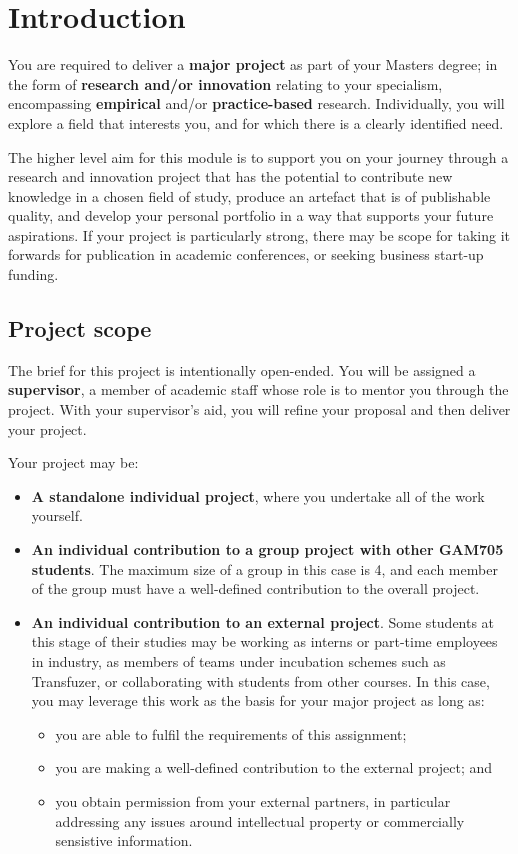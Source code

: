 \chapter{Introduction}

You are required to deliver a \textbf{major project} as part of your Masters degree; in the form of \textbf{research and/or innovation} relating to your specialism, encompassing \textbf{empirical} and/or \textbf{practice-based} research. Individually, you will explore a field that interests you, and for which there is a clearly identified need.

The higher level aim for this module is to support you on your journey through a research and innovation project that has the potential to contribute new knowledge in a chosen field of study, produce an artefact that is of publishable quality, and develop your personal portfolio in a way that supports your future aspirations. If your project is particularly strong, there may be scope for taking it forwards for publication in academic conferences, or seeking business start-up funding.

\section*{Project scope}

The brief for this project is intentionally open-ended. You will be assigned a \textbf{supervisor}, a member of academic staff whose role is to mentor you through the project. With your supervisor's aid, you will refine your proposal and then deliver your project.

Your project may be:

\begin{itemize}
    \item \textbf{A standalone individual project}, where you undertake all of the work yourself.
    \item \textbf{An individual contribution to a group project with other GAM705 students}. The maximum size of a group in this case is 4, and each member of the group must have a well-defined contribution to the overall project.
    \item \textbf{An individual contribution to an external project}. Some students at this stage of their studies may be working as interns or part-time employees in industry, as members of teams under incubation schemes such as Transfuzer, or collaborating with students from other courses. In this case, you may leverage this work as the basis for your major project
    as long as:
    \begin{itemize}
        \item you are able to fulfil the requirements of this assignment;
        \item you are making a well-defined contribution to the external project; and
        \item you obtain permission from your external partners, in particular addressing any issues around intellectual property or commercially sensistive information.
    \end{itemize}
\end{itemize}

